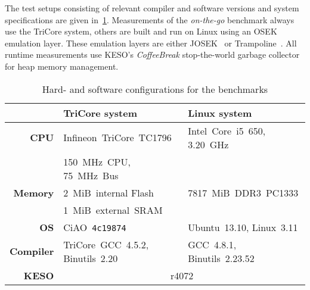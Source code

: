 	The test setups consisting of relevant compiler and software versions and system specifications are given
	in~\cref{tbl:eval:setup}. Measurements of the \emph{on-the-go} benchmark always use the TriCore system, others are
	built and run on Linux using an OSEK emulation layer. These emulation layers are either JOSEK~\cite{josek:10} or
	Trampoline~\cite{bechennec:06:etfa}. All runtime measurements use KESO's \emph{CoffeeBreak} stop-the-world garbage
	collector for heap memory management.

	\begin{table}
		\centering
		\begin{tabular}{rll}
				& \textbf{TriCore system} & \textbf{Linux system}\\\hline\hline
			\multirow{1}{*}{\textbf{CPU}} &
				  Infineon~TriCore~TC1796 & Intel~Core~i5~650, 3.20~GHz\\
				& 150~MHz~CPU, 75~MHz~Bus & \\
			\multirow{1}{*}{\textbf{Memory}} &
				  2~MiB~internal Flash & 7817~MiB~DDR3~PC1333\\
				& 1~MiB~external~SRAM & \\
			\textbf{OS} &
				CiAO~\texttt{4c19874} & Ubuntu~13.10, Linux~3.11\\
			\textbf{Compiler} &
				TriCore~GCC~4.5.2, Binutils~2.20 & GCC~4.8.1, Binutils~2.23.52\\
			\textbf{KESO} &
				\multicolumn{2}{c}{r4072}
		\end{tabular}

		\caption{Hard- and software configurations for the benchmarks}
		\label{tbl:eval:setup}
	\end{table}

